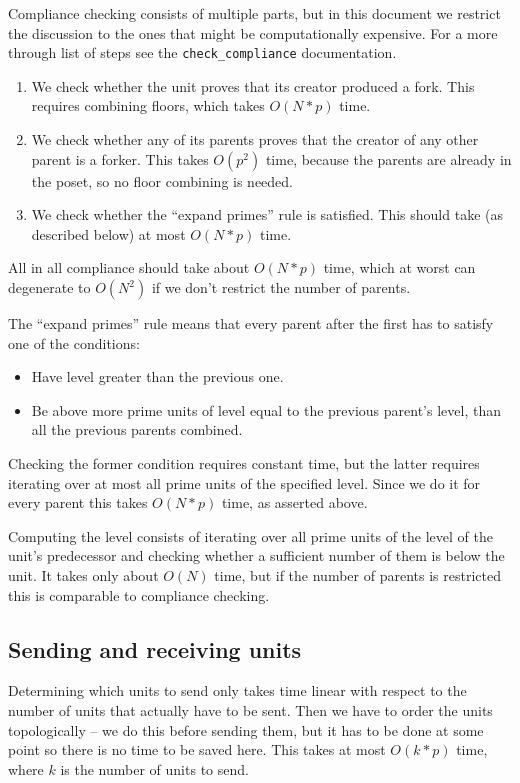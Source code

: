 \documentclass[a4paper,10pt]{article}
\begin{document}
			Compliance checking consists of multiple parts, but in this document we restrict the discussion to the ones that might be computationally expensive.
			For a more through list of steps see the \lstinline{check_compliance} documentation.
			\begin{enumerate}
				\item We check whether the unit proves that its creator produced a fork. This requires combining floors, which takes $O(N*p)$ time.
				\item We check whether any of its parents proves that the creator of any other parent is a forker. This takes $O(p^2)$ time,
					because the parents are already in the poset, so no floor combining is needed.
				\item We check whether the ``expand primes'' rule is satisfied. This should take (as described below) at most $O(N*p)$ time.
			\end{enumerate}
			All in all compliance should take about $O(N*p)$ time, which at worst can degenerate to $O(N^2)$ if we don't restrict the number of parents.

			The ``expand primes'' rule means that every parent after the first has to satisfy one of the conditions:
			\begin{itemize}
				\item Have level greater than the previous one.
				\item Be above more prime units of level equal to the previous parent's level, than all the previous parents combined.
			\end{itemize}
			Checking the former condition requires constant time, but the latter requires iterating over at most all prime units of the specified level.
			Since we do it for every parent this takes $O(N*p)$ time, as asserted above.

			Computing the level consists of iterating over all prime units of the level of the unit's predecessor and checking whether a sufficient number of them is below the unit.
			It takes only about $O(N)$ time, but if the number of parents is restricted this is comparable to compliance checking.
		\subsection{Sending and receiving units}
		 Determining which units to send only takes time linear with respect to the number of units that actually have to be sent.
			Then we have to order the units topologically -- we do this before sending them, but it has to be done at some point so there is no time to be saved here.
			This takes at most $O(k*p)$ time, where $k$ is the number of units to send.
\end{document}
